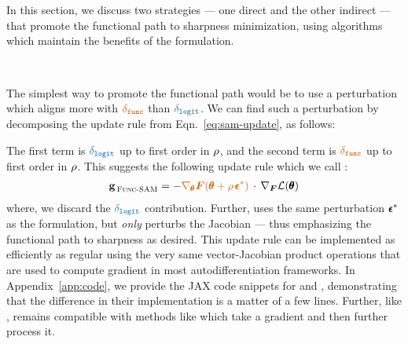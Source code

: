 In this section, we discuss two strategies --- one direct and the other indirect --- 
that promote the functional path to sharpness
minimization, using algorithms which maintain the benefits of the \SAM formulation. 

\subsection{$\,$\funcSAM}

The simplest way to promote the functional path would be to use a perturbation which aligns more with $\fcolor{\gfun}$ than $\lcolor{\glog}$. We can find
such a perturbation by decomposing the \SAM update rule from Eqn.~\ref{eq:sam-update}, as follows:

The first term is $\lcolor{\glog}$ up to first order in $\rho$, and the second term is $\fcolor{\gfun}$ up to first order in $\rho$. This suggests the following
update rule which we call \funcSAM:
\begin{align}\label{eq:func-sam-grad}
    \m{g}_{\, {\funcSAMbrief}} = -\fcolor{\nabla_\btheta \boldsymbol{F}(\btheta + \rho \,\beps^\ast)}\,\cdot\, \nabla_{\boldsymbol{F}}\Loss(\btheta)
\end{align}
where, we discard the $\lcolor{\glog}$ contribution.
Further, \funcSAM uses the same perturbation ${\pmb \epsilon}^\ast$ as the \SAM formulation, but \emph{only} perturbs the Jacobian --- thus
emphasizing the functional path to sharpness as desired. This update rule can be implemented as efficiently as regular \SAM using the 
very same vector-Jacobian product operations that are used to compute
gradient in most autodifferentiation frameworks. In Appendix~\ref{app:code}, we provide the JAX code snippets for \SAM and \funcSAM, demonstrating that the difference in their implementation is a matter of a few lines. Further, like \SAM, \funcSAM remains compatible with methods like \adamw which take a gradient and then further process it.

